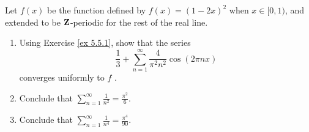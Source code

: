 \begin{exercise}\label{ex 5.5.2}
    Let \(f(x)\) be the function defined by \(f(x) = (1 - 2x)^2\) when \(x \in [0, 1)\), and extended to be \(\mathbf{Z}\)-periodic for the rest of the real line.
    \begin{enumerate}
        \item Using Exercise \ref{ex 5.5.1}, show that the series
              \[
                  \frac{1}{3} + \sum_{n = 1}^\infty \frac{4}{\pi^2 n^2} \cos(2 \pi n x)
              \]
              converges uniformly to \(f\) .
        \item Conclude that \(\sum_{n = 1}^\infty \frac{1}{n^2} = \frac{\pi^2}{6}\).
        \item Conclude that \(\sum_{n = 1}^\infty \frac{1}{n^4} = \frac{\pi^4}{90}\).
    \end{enumerate}
\end{exercise}


